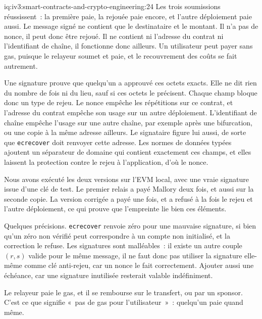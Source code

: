\begin{solution}{iq:iv3:smart-contracts-and-crypto-engineering:24}
Les trois soumissions réussissent~: la première paie, la rejouée paie encore, et l'autre déploiement paie aussi. Le message signé ne contient que le destinataire et le montant. Il n'a pas de nonce, il peut donc être rejoué. Il ne contient ni l'adresse du contrat ni l'identifiant de chaîne, il fonctionne donc ailleurs. Un utilisateur peut payer sans gas, puisque le relayeur soumet et paie, et le recouvrement des coûts se fait autrement.
\label{lst:iv3:cr:saferelay}

Une signature prouve que quelqu'un a approuvé ces octets exacts. Elle ne dit rien du nombre de fois ni du lieu, sauf si ces octets le précisent. Chaque champ bloque donc un type de rejeu. Le nonce empêche les répétitions sur ce contrat, et l'adresse du contrat empêche son usage sur un autre déploiement. L'identifiant de chaîne empêche l'usage sur une autre chaîne, par exemple après une bifurcation, ou une copie à la même adresse ailleurs. Le signataire figure lui aussi, de sorte que \texttt{ecrecover} doit renvoyer cette adresse. Les normes de données typées ajoutent un séparateur de domaine qui contient exactement ces champs, et elles laissent la protection contre le rejeu à l'application, d'où le nonce.

Nous avons exécuté les deux versions sur l'EVM local, avec une vraie signature issue d'une clé de test. Le premier relais a payé Mallory deux fois, et aussi sur la seconde copie. La version corrigée a payé une fois, et a refusé à la fois le rejeu et l'autre déploiement, ce qui prouve que l'empreinte lie bien ces éléments.

Quelques précisions. \texttt{ecrecover} renvoie zéro pour une mauvaise signature, si bien qu'un zéro non vérifié peut correspondre à un compte non initialisé, et la correction le refuse. Les signatures sont malléables~: il existe un autre couple $(r, s)$ valide pour le même message, il ne faut donc pas utiliser la signature elle-même comme clé anti-rejeu, car un nonce le fait correctement. Ajouter aussi une échéance, car une signature inutilisée resterait valable indéfiniment.

Le relayeur paie le gas, et il se rembourse sur le transfert, ou par un sponsor. C'est ce que signifie «~pas de gas pour l'utilisateur~»~: quelqu'un paie quand même.

\end{solution}

